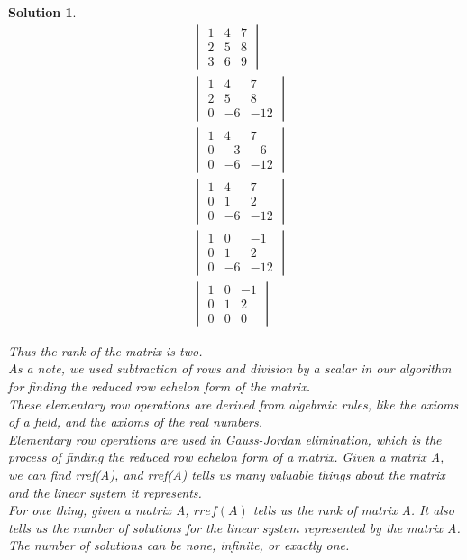 \documentclass{article}
\newtheorem*{solution}{Solution}
\begin{document}
\begin{solution}
\begin{align*}
&\begin{vmatrix}
1 & 4 & 7 \\
2 & 5 & 8 \\
3 & 6 & 9
\end{vmatrix} \\
&\begin{vmatrix}
1 & 4 & 7 \\
2 & 5 & 8 \\
0 & -6 & -12
\end{vmatrix} \\
&\begin{vmatrix}
1 & 4 & 7 \\
0 & -3 & -6 \\
0 & -6 & -12
\end{vmatrix} \\
&\begin{vmatrix}
1 & 4 & 7 \\
0 & 1 & 2 \\
0 & -6 & -12
\end{vmatrix} \\
&\begin{vmatrix}
1 & 0 & -1 \\
0 & 1 & 2 \\
0 & -6 & -12
\end{vmatrix} \\
&\begin{vmatrix}
1 & 0 & -1 \\
0 & 1 & 2 \\
0 & 0 & 0
\end{vmatrix}
\end{align*}

Thus the rank of the matrix is two. \\

As a note, we used subtraction of rows and division by a scalar in our algorithm for finding the reduced row echelon form of the matrix. \\

These elementary row operations are derived from algebraic rules, like the axioms of a field, and the axioms of the real numbers. \\

Elementary row operations are used in Gauss-Jordan elimination, which is the process of finding the reduced row echelon form of a matrix. Given a matrix A, we can find rref(A), and rref(A) tells us many valuable things about the matrix and the linear system it represents. \\

For one thing, given a matrix A, $rref(A)$ tells us the rank of matrix A. It also tells us the number of solutions for the linear system represented by the matrix A. The number of solutions can be none, infinite, or exactly one.
\end{solution}
\end{document}
